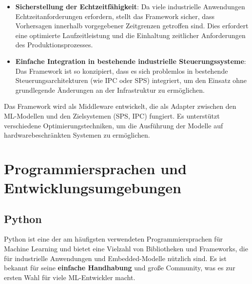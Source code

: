 \begin{itemize}
    \item \textbf{Sicherstellung der Echtzeitfähigkeit}: Da viele industrielle Anwendungen Echtzeitanforderungen erfordern, stellt das Framework sicher, dass 
    Vorhersagen innerhalb vorgegebener Zeitgrenzen getroffen sind. Dies erfordert eine optimierte Laufzeitleistung und die Einhaltung zeitlicher Anforderungen des Produktionsprozesses.
   
    \item \textbf{Einfache Integration in bestehende industrielle Steuerungssysteme}: Das Framework ist so konzipiert, dass es sich problemlos in bestehende Steuerungsarchitekturen 
    (wie IPC oder SPS) integriert, um den Einsatz ohne grundlegende Änderungen an der Infrastruktur zu ermöglichen.
\end{itemize}

Das Framework wird als Middleware entwickelt, die als Adapter zwischen den ML-Modellen und den Zielsystemen (SPS, IPC) fungiert. Es unterstützt verschiedene Optimierungstechniken, 
um die Ausführung der Modelle auf hardwarebeschränkten Systemen zu ermöglichen.

\section{Programmiersprachen und Entwicklungsumgebungen}

\subsection{Python}
Python ist eine der am häufigsten verwendeten Programmiersprachen für Machine Learning \cite{info11040193} und bietet eine Vielzahl von Bibliotheken und Frameworks, 
die für industrielle Anwendungen und Embedded-Modelle nützlich sind. Es ist bekannt für seine \textbf{einfache Handhabung} und große Community, 
was es zur ersten Wahl für viele ML-Entwickler macht.

